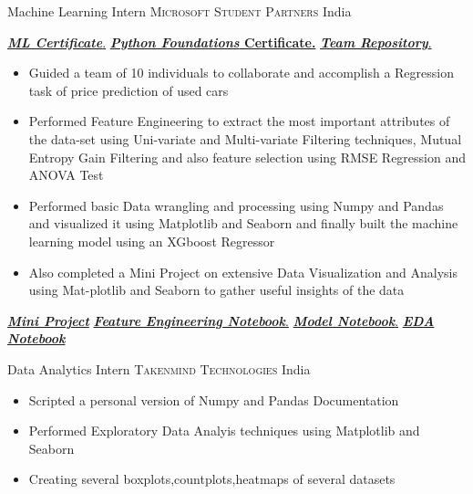 \documentclass[11pt,a4paper,sans]{moderncv} %
\begin{document}
{Machine Learning Intern}
{\textsc{Microsoft Student Partners}}
{India}
{}
{
\href{https://github.com/teetangh/Kaustav-All-Certifications/blob/master/Artificial\%20Intelligence/MSP\%20ML\%20Internship/internship\%20certificate.pdf}{ \textbf{\emph{ML Certificate}}.}
\href{https://github.com/teetangh/Kaustav-All-Certifications/blob/master/Artificial\%20Intelligence/MSP\%20ML\%20Internship/Course\%20Completion\%20Certificate.pdf}{ \textbf{\emph{Python Foundations} Certificate.}}
\href{https://github.com/Microsoft-ML-Internship-Team/Major-Project-Submissions}{ \textbf{\emph{Team Repository}}.}
\begin{itemize}
    \item {Guided a team of 10 individuals to collaborate and accomplish a Regression task of price prediction of used cars}
    \item {Performed Feature Engineering to extract the most important attributes of the data-set using Uni-variate and Multi-variate Filtering techniques, Mutual Entropy Gain Filtering and also feature selection using RMSE Regression and ANOVA Test}
    \item {Performed basic Data wrangling and processing using Numpy and Pandas and visualized it using Matplotlib and Seaborn and finally built the machine learning model using an XGboost Regressor}
    \item {Also completed a Mini Project on extensive Data Visualization and Analysis using Mat-plotlib and Seaborn to gather useful insights of the data}
\end{itemize}
\href{https://github.com/teetangh/Microsoft-Machine-Learning-Internship/blob/master/MINOR\%20PROJECT/Microsoft_Minor_Project_v2.ipynb}{\textbf{\emph{Mini Project}}}
\href{https://github.com/Microsoft-ML-Internship-Team/Major-Project-Submissions/blob/master/KAUSTAV/02_Kaustav_feature_engineering_v4.ipynb}{\textbf{\emph{ Feature Engineering Notebook}}.}
\href{https://github.com/Microsoft-ML-Internship-Team/Major-Project-Submissions/blob/master/KAUSTAV/03_Kaustav_Buidling_the_model_v1.ipynb}{\textbf{\emph{ Model Notebook}}.}
\href{https://github.com/Microsoft-ML-Internship-Team/Major-Project-Submissions/blob/master/KAUSTAV/01_Kaustav_data_preprocess_EDA_v7.ipynb}{\textbf{\emph{ EDA Notebook}}}
}


{Data Analytics Intern}
{\textsc{Takenmind Technologies}}
{India}
{}
{
\begin{itemize}
    \item{Scripted a personal version of Numpy and Pandas Documentation }
    \item{Performed Exploratory Data Analyis techniques using Matplotlib and Seaborn }
    \item{Creating several boxplots,countplots,heatmaps of several datasets}
\end{itemize}
}
\end{document}
